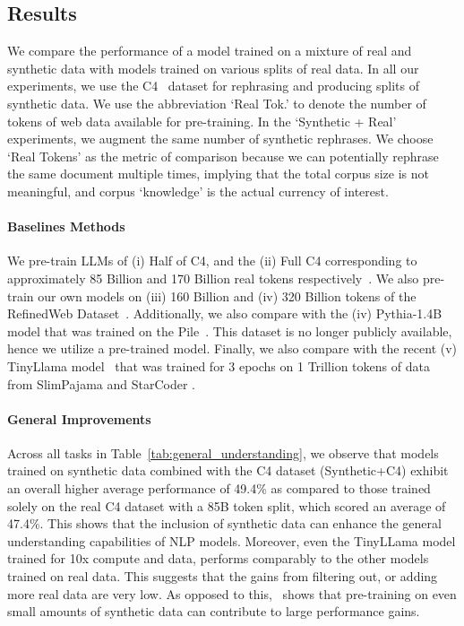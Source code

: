 \subsection{Results}
We compare the performance of a model trained on a mixture of real and synthetic data with models trained on various splits of real data. In all our experiments, we use the C4~\citep{raffel2020exploring} dataset for rephrasing and producing splits of synthetic data. 
We use the abbreviation `Real Tok.' to denote the number of tokens of web data available for pre-training. In the `Synthetic + Real' experiments, we augment the same number of synthetic rephrases. We choose `Real Tokens' as the metric of comparison because we can potentially rephrase the same document multiple times, implying that the total corpus size is not meaningful, and corpus `knowledge' is the actual currency of interest.

\paragraph{Baselines Methods}
We pre-train LLMs of 
(i) Half of C4, and the (ii) Full C4 corresponding to approximately
85 Billion and 170 Billion real tokens respectively~\citep{raffel2020exploring}. We also pre-train our own models on (iii) 160 Billion and (iv) 320 Billion tokens of the RefinedWeb Dataset~\citep{penedo2023refinedweb}. Additionally, we also compare with the (iv) Pythia-1.4B model that was trained on the Pile~\citep{gao2020pile}. This dataset is no longer publicly available, hence we utilize a pre-trained model. Finally, we also compare with the recent (v) TinyLlama model~\citep{zhang2024tinyllama} that was trained for 3 epochs  on 1 Trillion tokens of data from 
SlimPajama \citep{shen2023slimpajama} and StarCoder \citep{li2023starcoder}.


\paragraph{General Improvements}
Across all tasks in Table~\ref{tab:general_understanding}, we observe that models trained on synthetic data combined with the C4 dataset (Synthetic+C4) exhibit an overall higher average performance of 49.4\% as compared to those trained solely on the real C4 dataset with a 85B token split, which scored an average of 47.4\%. This shows that the inclusion of synthetic data can enhance the general understanding capabilities of NLP models. Moreover, even the TinyLLama model trained for 10x compute and data, performs comparably to the other models trained on real data. This suggests that the gains from filtering out, or adding more real data are very low. As opposed to this, \ours~shows that pre-training on even small amounts of synthetic data can contribute to large performance gains.

